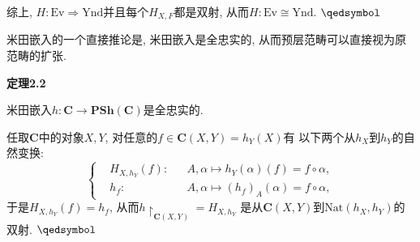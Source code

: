 \documentclass[UTF8]{ctexart}
\begin{document}
综上, $H:\mathrm{Ev}\Rightarrow\mathrm{Ynd}$并且每个$H_{X,F}$都是双射,
从而$H:\mathrm{Ev}\cong\mathrm{Ynd}$. \hfill $\qedsymbol$

\vspace{10pt}

米田嵌入的一个直接推论是, 米田嵌入是全忠实的, 从而预层范畴可以直接视为原范畴的扩张.

\hypertarget{sec:定理2.2}{}
\noindent\textbf{定理2.2}

米田嵌入$h:\mathbf{C}\to\mathbf{PSh}(\mathbf{C})$是全忠实的.


任取$\mathbf{C}$中的对象$X,Y$, 对任意的$f\in\mathbf{C}(X,Y)=h_Y(X)$有
以下两个从$h_X$到$h_Y$的自然变换:
\[\left\{\begin{aligned}
    &H_{X,h_Y}(f):&&A,\alpha\mapsto h_Y(\alpha)(f)=f\circ\alpha,\\[-3pt]
    &h_f:&&A,\alpha\mapsto(h_f)_A(\alpha)=f\circ\alpha,
\end{aligned}\right.\]
于是$H_{X,h_Y}(f)=h_f$, 从而$h\!\restriction_{\mathbf{C}(X,Y)}=H_{X,h_Y}$
是从$\mathbf{C}(X,Y)$到$\mathrm{Nat}(h_X,h_Y)$的双射. \hfill $\qedsymbol$
\end{document}
